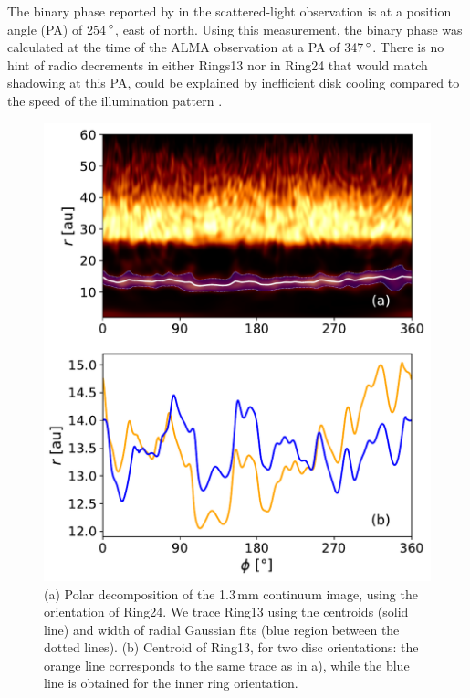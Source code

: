 \documentclass[letters,usenatbib,times]{mnras}
\begin{document}
The binary phase reported by \citet{dOrazi}  in the scattered-light observation is at a position angle (PA) of 254\,$\hbox{$^\circ$}$, east of north. Using this measurement, the binary phase was calculated at the time of the ALMA observation at a PA of 347\,$\hbox{$^\circ$}$. There is no hint of  radio decrements  in  either Rings13 nor  in Ring24 that would match shadowing at this PA,   could be explained by inefficient disk cooling compared to the speed of the illumination pattern \citep{Casassus2019MNRAS.486L..58C}.  

\begin{figure}
    \includegraphics[width=\columnwidth]{polar_ring_aprox_and_diff_inner.pdf}
    \caption{(a) Polar decomposition of the 1.3\,mm continuum image, using the orientation of Ring24. We trace Ring13 using the centroids (solid line) and width of radial Gaussian fits (blue region between the dotted lines). (b) Centroid of Ring13, for two disc orientations: the orange line corresponds to the same trace as in a), while the blue line is obtained for the inner ring orientation.}
    \label{fig:polarring}
\end{figure}
\end{document}

